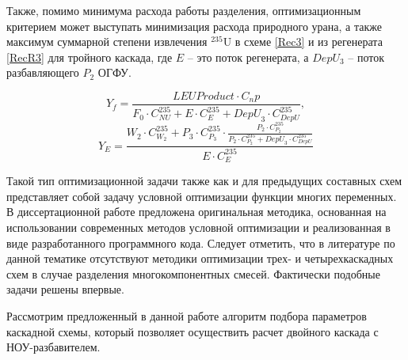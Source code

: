 Также, помимо минимума расхода работы разделения, оптимизационным критерием может выступать минимизация расхода природного урана, а также максимум суммарной степени извлечения $^{235}$U в схеме \ref{Rec3} и из регенерата \ref{RecR3} для тройного каскада, где $E$ -- это поток регенерата, а $DepU_{3}$ -- поток разбавляющего $P_2$ ОГФУ.

\begin{equation} \label{Rec3} 
    Y_{f} = \frac{LEU Product \cdot C_np}{F_0 \cdot C_{NU}^{235} + E \cdot C_{E}^{235} + {DepU}_3 \cdot C_{DepU}^{235}},
\end{equation} 
\begin{equation} \label{RecR3} 
    Y_{E} = \frac{W_2\cdot C_{W_2}^{235}+P_3\cdot C_{P_3}^{235}\cdot \frac{P_2\cdot C_{P_2}^{235}}{P_2\cdot C_{P_2}^{235}+ {DepU}_3 \cdot C_{DepU}^{235}}}{E \cdot C_{E}^{235}}        
\end{equation} 

Такой тип оптимизационной задачи также как и для предыдущих составных схем представляет собой задачу условной оптимизации функции многих переменных. В диссертационной работе предложена оригинальная методика, основанная на использовании современных методов условной оптимизации и реализованная в виде разработанного программного кода.
Следует отметить, что в литературе по данной тематике отсутствуют методики оптимизации трех- и четырехкаскадных схем в случае разделения многокомпонентных смесей. Фактически подобные задачи решены впервые.

Рассмотрим предложенный в данной работе алгоритм подбора параметров каскадной схемы, который позволяет осуществить расчет двойного каскада с НОУ-разбавителем.

